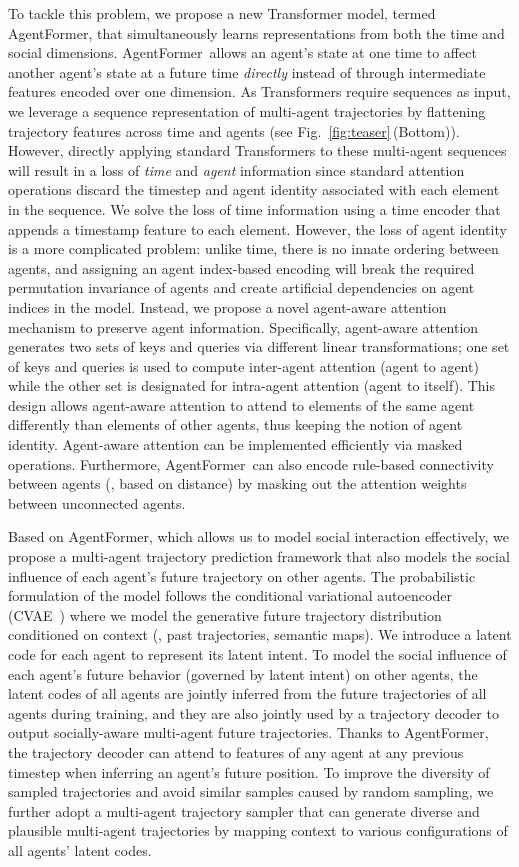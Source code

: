 \documentclass[10pt,twocolumn,letterpaper]{article}
\newcommand{\mname}{AgentFormer}
\begin{document}
To tackle this problem, we propose a new Transformer model, termed \mname, that simultaneously learns representations from both the time and social dimensions. \mbox{\mname}\ allows an agent's state at one time to affect another agent's state at a future time \emph{directly} instead of through intermediate features encoded over one dimension. As Transformers require sequences as input, we leverage a sequence representation of multi-agent trajectories by flattening trajectory features across time and agents (see Fig.~\ref{fig:teaser}\,(Bottom)). However, directly applying standard Transformers to these multi-agent sequences will result in a loss of \emph{time} and \emph{agent} information since standard attention operations discard the timestep and agent identity associated with each element in the sequence. We solve the loss of time information using a time encoder that appends a timestamp feature to each element. However, the loss of agent identity is a more complicated problem: unlike time, there is no innate ordering between agents, and assigning an agent index-based encoding will break the required permutation invariance of agents and create artificial dependencies on agent indices in the model. Instead, we propose a novel agent-aware attention mechanism to preserve agent information. Specifically, agent-aware attention generates two sets of keys and queries via different linear transformations; one set of keys and queries is used to compute inter-agent attention  (agent to agent) while the other set is designated for intra-agent attention (agent to itself). This design allows agent-aware attention to attend to elements of the same agent differently than elements of other agents, thus keeping the notion of agent identity. Agent-aware attention can be implemented efficiently via masked operations. Furthermore, \mname\ can also encode rule-based connectivity between agents (\eg, based on distance) by masking out the attention weights between unconnected agents.

Based on \mname, which allows us to model social interaction effectively, we propose a multi-agent trajectory prediction framework that also models the social influence of each agent's future trajectory on other agents. The probabilistic formulation of the model follows the conditional variational autoencoder (CVAE~\cite{kingma2013auto}) where we model the generative future trajectory distribution conditioned on context (\eg, past trajectories, semantic maps). We introduce a latent code for each agent to represent its latent intent. To model the social influence of each agent's future behavior (governed by latent intent) on other agents, the latent codes of all agents are jointly inferred from the future trajectories of all agents during training, and they are also jointly used by a trajectory decoder to output socially-aware multi-agent future trajectories. Thanks to \mname, the trajectory decoder can attend to features of any agent at any previous timestep when inferring an agent's future position. To improve the diversity of sampled trajectories and avoid similar samples caused by random sampling, we further adopt a multi-agent trajectory sampler that can generate diverse and plausible multi-agent trajectories by mapping context to various configurations of all agents' latent codes.
\end{document}
